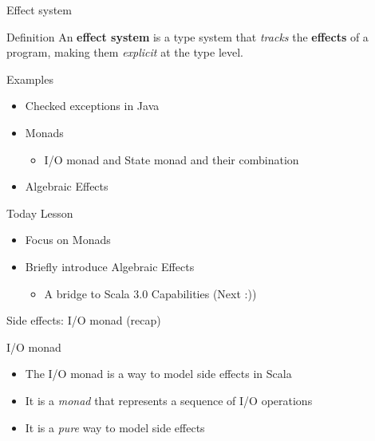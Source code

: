 \documentclass[presentation, 10pt]{beamer}\mode<presentation>{\usetheme{metropolis}}
\begin{document}
\begin{frame}{Effect system}
\begin{exampleblock}{Definition}
An \textbf{effect system} is a type system that \emph{tracks} the \textbf{effects} of a program, making them \emph{explicit} at the type level.
\end{exampleblock}
\begin{exampleblock}{Examples}
	\begin{itemize}
	\item Checked exceptions in Java
	\item Monads
	\begin{itemize}
		\item I/O monad and State monad and their combination
	\end{itemize}
	\item Algebraic Effects
	\end{itemize}
\end{exampleblock}
\begin{alertblock}{Today Lesson}
	\begin{itemize}
		\item Focus on Monads 
		\item Briefly introduce Algebraic Effects
		\begin{itemize}
			\item A bridge to Scala 3.0 Capabilities (Next :))
		\end{itemize}
	\end{itemize}
\end{alertblock}
\end{frame}

\begin{frame}[fragile]{Side effects: I/O monad (recap)}
\begin{exampleblock}{I/O monad}
	\begin{itemize}
		\item The I/O monad is a way to model side effects in Scala
		\item It is a \emph{monad} that represents a sequence of I/O operations
		\item It is a \emph{pure} way to model side effects
	\end{itemize}
\end{exampleblock}
\inputminted[firstline=6,lastline=17]{scala}{code/src/main/scala/monads/IO.scala}
\end{frame}
\end{document}

